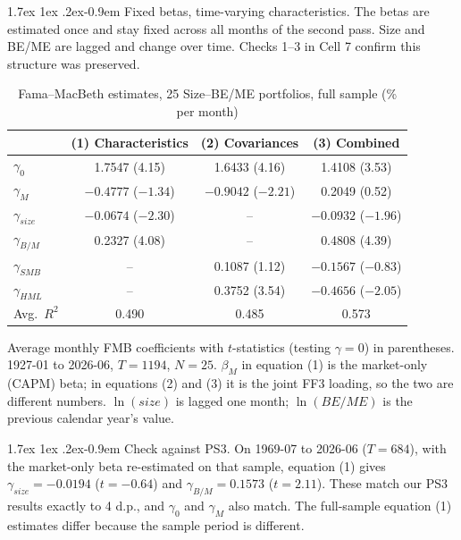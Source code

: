 \documentclass[11pt]{article}
\makeatletter
\renewcommand\paragraph{\@startsection{paragraph}{4}{0pt}%
  {1.7ex \@plus 1ex \@minus .2ex}{-0.9em}%
  {\normalfont\bfseries\normalsize\color{psink}}}
\makeatother
\begin{document}
\paragraph{Fixed betas, time-varying characteristics.} The betas are estimated once and
stay fixed across all months of the second pass. Size and BE/ME are lagged and change
over time. Checks 1--3 in Cell 7 confirm this structure was preserved.

\begin{table}[H]\centering\small
\caption{Fama--MacBeth estimates, 25 Size--BE/ME portfolios, full sample (\% per month)}
\begin{tabular}{lccc}
\toprule
 & (1) Characteristics & (2) Covariances & (3) Combined \\
\midrule
$\gamma_0$       & 1.7547 (4.15)    & 1.6433 (4.16)    & 1.4108 (3.53)    \\
$\gamma_M$       & $-0.4777$ ($-1.34$) & $-0.9042$ ($-2.21$) & 0.2049 (0.52) \\
$\gamma_{size}$  & $-0.0674$ ($-2.30$) & --            & $-0.0932$ ($-1.96$) \\
$\gamma_{B/M}$   & 0.2327 (4.08)    & --               & 0.4808 (4.39)    \\
$\gamma_{SMB}$   & --               & 0.1087 (1.12)    & $-0.1567$ ($-0.83$) \\
$\gamma_{HML}$   & --               & 0.3752 (3.54)    & $-0.4656$ ($-2.05$) \\
\midrule
Avg.\ $R^2$      & 0.490            & 0.485            & 0.573            \\
\bottomrule
\end{tabular}
\par\smallskip\footnotesize Average monthly FMB coefficients with $t$-statistics (testing
$\gamma=0$) in parentheses. 1927-01 to 2026-06, $T=1194$, $N=25$. $\beta_M$ in equation
(1) is the market-only (CAPM) beta; in equations (2) and (3) it is the joint FF3 loading,
so the two are different numbers. $\ln(size)$ is lagged one month; $\ln(BE/ME)$ is the
previous calendar year's value.
\end{table}

\paragraph{Check against PS3.} On 1969-07 to 2026-06 ($T = 684$), with the market-only
beta re-estimated on that sample, equation (1) gives $\gamma_{size} = -0.0194$
($t = -0.64$) and $\gamma_{B/M} = 0.1573$ ($t = 2.11$). These match our PS3 results
exactly to 4 d.p., and $\gamma_0$ and $\gamma_M$ also match. The full-sample equation
(1) estimates differ because the sample period is different.
\end{document}
